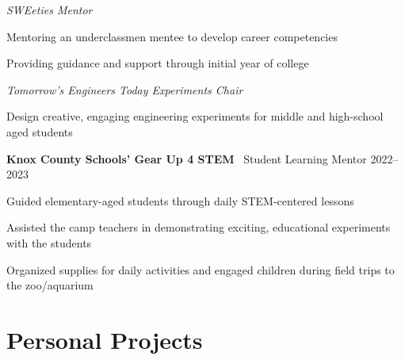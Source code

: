 \documentclass[11pt,a4paper]{article}
\begin{document}
\textit{SWEeties Mentor} \vspace{-6pt}

\begin{itemize}[leftmargin=*, topsep=0pt, itemsep=1pt, partopsep=0pt, parsep=0pt]
  {\small
  \item Mentoring an underclassmen mentee to develop career competencies
  \item Providing guidance and support through initial year of college
  }
\end{itemize}
\vspace{-5pt}

\textit{Tomorrow’s Engineers Today Experiments Chair} \vspace{-6pt}
\begin{itemize}[leftmargin=*, topsep=0pt, itemsep=1pt, partopsep=0pt, parsep=0pt]
  {\small
  \item Design creative, engaging engineering experiments for middle and high-school aged students
  }
\end{itemize}
\vspace{-5pt}

\noindent
\textbf{Knox County Schools’ Gear Up 4 STEM} \textbar\ Student Learning Mentor \hfill 2022--2023 \vspace{-6pt}
\begin{itemize}[leftmargin=*, topsep=0pt, itemsep=1pt, partopsep=0pt, parsep=0pt]
  {\small
  \item Guided elementary-aged students through daily STEM-centered lessons
  \item Assisted the camp teachers in demonstrating exciting, educational experiments with the students
  \item Organized supplies for daily activities and engaged children during field trips to the zoo/aquarium
  }
\end{itemize}
\vspace{-5pt}

\section*{Personal Projects}

 \\
 \\
 \\
 \\
\vspace{-5pt}
\end{document}
